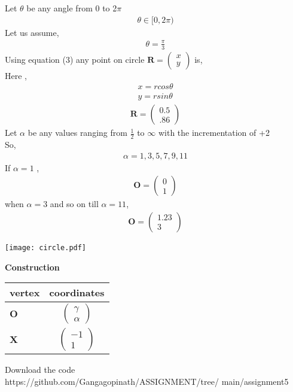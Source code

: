 \documentclass[10pt,a4paper]{report}
\newcommand{\myvec}[1]{\ensuremath{\begin{pmatrix}#1\end{pmatrix}}}
\let\vec\mathbf
\let\vec\mathbf
\begin{document}
\begin{multicols}{2}
{Let $\theta$ be any angle from 0 to 2$\pi$\\ \vspace{1mm}
\begin{align}
    \theta \in [0,2\pi)
\end{align}
Let us assume, \\ \vspace{1mm}
\begin{align}
    \theta=\frac{\pi}{3} 
\end{align}
Using equation (3) any point on circle   $ \vec{R}=\myvec{
    x\\
    y
    } $ is, \\ \vspace{1mm}
    Here ,\\  \vspace{2mm}
\begin{align}
    x=rcos\theta\\
    y=rsin\theta
\end{align}
\begin{align}
 \vec{R}=\myvec{
    0.5\\
    .86
    } 
\end{align}
Let $\alpha$ be any values ranging from $\frac{1}{2}$ to $\infty$  with the incrementation of +2\\
So, \\ 
\begin{align}
    \alpha = 1,3,5,7,9,11
\end{align}
If $\alpha=1$ ,\\ 
\begin{align}
    \vec{O}=\myvec{
    0\\
    1
    }
\end{align}
when $\alpha=3$ and so on till $\alpha=11$,\\ 
\begin{align}
    \vec{O}=\myvec{
    1.23\\
   3
    } 
\end{align}
\begin{center}
 \texttt{[image: circle.pdf]}  
 \end{center}\vspace{1mm}
 \vspace{2mm} \textbf{Construction}
\begin{center}
\setlength{\arrayrulewidth}{0.5mm}
\setlength{\tabcolsep}{6pt}
\renewcommand{\arraystretch}{1.5}
    \begin{tabular}{|l|c|}
    \hline 
    \textbf{vertex} & \textbf{coordinates} \\ \hline
   $\vec{O}$ & $\myvec{
   \gamma\\
   \alpha
   } $ \\\hline
   $\vec{X}$ & $\myvec{
   -1\\
   1
   } $ \\\hline
      \end{tabular}
  \end{center}
  

\raggedright  Download the code \\
https://github.com/Gangagopinath/ASSIGNMENT/tree/
\newline
main/assignment5
}  \end{multicols}
\end{document}
